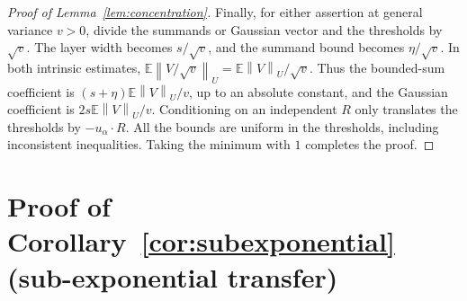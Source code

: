 \documentclass[11pt,letterpaper]{article}
\theoremstyle{remark}
\newcommand{\E}{\mathbb E}
\newcommand{\norm}[1]{\left\lVert#1\right\rVert}
\begin{document}
\begin{proof}[Proof of Lemma~\ref{lem:concentration}]
Finally, for either assertion at general variance \(v>0\), divide
the summands or Gaussian vector and the thresholds by \(\sqrt v\).
The layer width becomes \(s/\sqrt v\), and the summand bound becomes
\(\eta/\sqrt v\). In both intrinsic estimates,
\(\E\norm{V/\sqrt v}_U=\E\norm{V}_U/\sqrt v\). Thus the
bounded-sum coefficient is \((s+\eta)\E\norm{V}_U/v\), up to
an absolute constant, and the Gaussian coefficient is
\(2s\E\norm{V}_U/v\).
Conditioning on an independent \(R\) only
translates the thresholds by \(-u_\alpha\cdot R\). All the bounds
are uniform in the thresholds, including inconsistent inequalities.
Taking the minimum with \(1\) completes the proof.
\end{proof}


\section{Proof of Corollary~\ref*{cor:subexponential} (sub-exponential transfer)}\label{app:subexponential}
\end{document}
